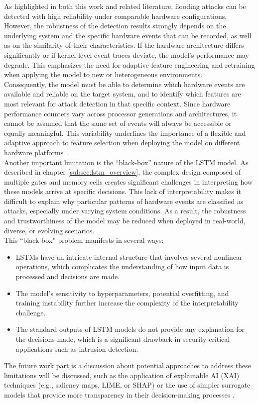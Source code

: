 As highlighted in both this work and related literature, flooding attacks can be detected with high reliability under comparable hardware configurations. However, the robustness of the detection results strongly depends on the underlying system and the specific hardware events that can be recorded, as well as on the similarity of their characteristics. If the hardware architecture differs significantly or if kernel-level event traces deviate, the model’s performance may degrade. This emphasizes the need for adaptive feature engineering and retraining when applying the model to new or heterogeneous environments.\\
Consequently, the model must be able to determine which hardware events are available and reliable on the target system, and to identify which features are most relevant for attack detection in that specific context. Since hardware performance counters vary across processor generations and architectures, it cannot be assumed that the same set of events will always be accessible or equally meaningful. This variability underlines the importance of a flexible and adaptive approach to feature selection when deploying the model on different hardware platforms~\cite{different_hardware_events}.\\

Another important limitation is the “black-box” nature of the LSTM model. As described in chapter \ref{subsec:lstm_overview}, the complex design composed of multiple gates and memory cells creates significant challenges in interpreting how these models arrive at specific decisions. This lack of interpretability makes it difficult to explain why particular patterns of hardware events are classified as attacks, especially under varying system conditions. As a result, the robustness and trustworthiness of the model may be reduced when deployed in real-world, diverse, or evolving scenarios.\\
This “black-box” problem manifests in several ways:
\begin{itemize}
    \item LSTMs have an intricate internal structure that involves several nonlinear operations, which complicates the understanding of how input data is processed and decisions are made.  
    \item The model’s sensitivity to hyperparameters, potential overfitting, and training instability further increase the complexity of the interpretability challenge.  
    \item The standard outputs of LSTM models do not provide any explanation for the decisions made, which is a significant drawback in security-critical applications such as intrusion detection.  
\end{itemize}
The future work part is a discussion about potential approaches to address these limitations will be discussed, such as the application of explainable AI (XAI) techniques (e.g., saliency maps, LIME, or SHAP) or the use of simpler surrogate models that provide more transparency in their decision-making processes \cite{lstm_transparency}.\\

